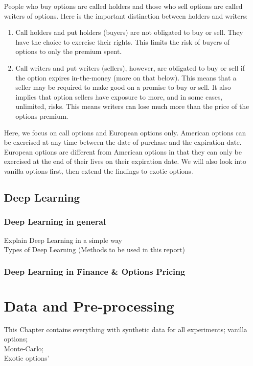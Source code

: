 \documentclass{report}
\begin{document}
People who buy options are called holders and those who sell options are called writers of options. Here is the important distinction between holders and writers:
\begin{enumerate}

\item Call holders and put holders (buyers) are not obligated to buy or sell. They have the choice to exercise their rights. This limits the risk of buyers of options to only the premium spent.
\item Call writers and put writers (sellers), however, are obligated to buy or sell if the option expires in-the-money (more on that below). This means that a seller may be required to make good on a promise to buy or sell. It also implies that option sellers have exposure to more, and in some cases, unlimited, risks. This means writers can lose much more than the price of the options premium.
\end{enumerate}


Here, we focus on call options and European options only. American options can be exercised at any time between the date of purchase and the expiration date. European options are different from American options in that they can only be exercised at the end of their lives on their expiration date.
We will also look into vanilla options first, then extend the findings to exotic options. 

\section{Deep Learning}
\subsection{Deep Learning in general}
Explain Deep Learning in a simple way\\
Types of Deep Learning (Methods to be used in this report)
\subsection{Deep Learning in Finance & Options Pricing}


\chapter{Data and Pre-processing}
This Chapter contains everything with synthetic data for all experiments;
vanilla options;\\
Monte-Carlo;\\
Exotic options'\\
\end{document}
